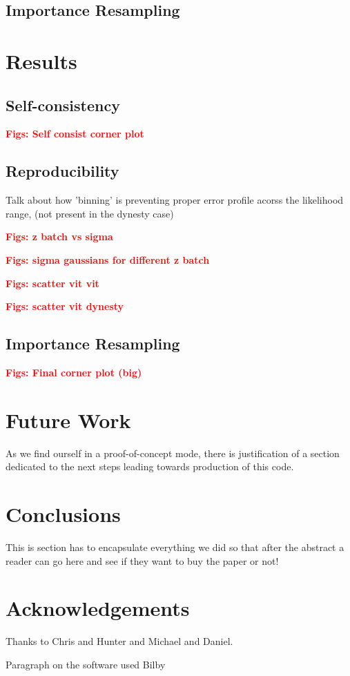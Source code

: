 \documentclass[aps,superscriptaddress,twocolumn,nopreprintnumbers,floatfix,groupedaddress]{revtex4-1}
\newcommand{\bilby}{{\sc Bilby}\xspace}
\newcommand{\dynesty}{{\sc dynesty}\xspace}
\begin{document}
\subsection{Importance Resampling}


\section{Results}\label{results}

\subsection{Self-consistency}

\textbf{\textcolor{red}{Figs: Self consist corner plot}}

\subsection{Reproducibility}

Talk about how 'binning' is preventing proper error profile acorss the likelihood range, (not present in the \dynesty case)

\textbf{\textcolor{red}{Figs: z batch vs sigma}}

\textbf{\textcolor{red}{Figs: sigma gaussians for different z batch}}

\textbf{\textcolor{red}{Figs: scatter vit vit}}

\textbf{\textcolor{red}{Figs: scatter vit dynesty}}

\subsection{Importance Resampling}


\textbf{\textcolor{red}{Figs: Final corner plot (big)}}


\section{Future Work}\label{future}

As we find ourself in a proof-of-concept mode, there is justification of a section dedicated to the next steps leading towards production of this code.

\section{Conclusions}\label{conc}

This is section has to encapsulate everything we did so that after the abstract a reader can go here and see if they want to buy the paper or not!

\section{Acknowledgements}

Thanks to Chris and Hunter and Michael and Daniel.

Paragraph on the software used \bilby\cite{bilby} 

\end{document}
